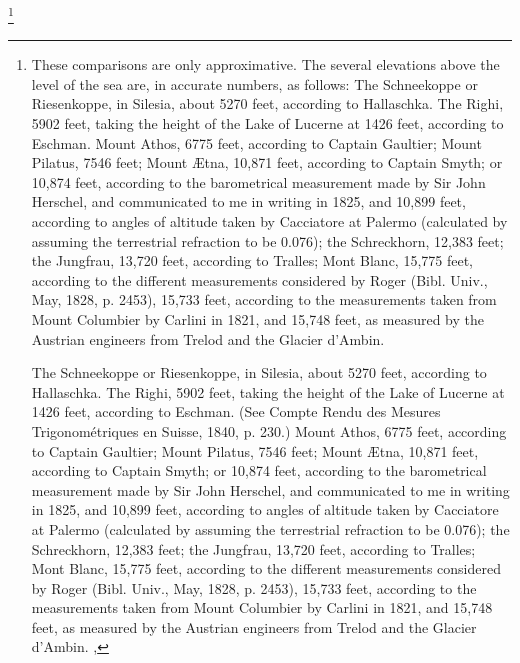 \footnote{These comparisons are only approximative. The several elevations above the level of the sea are, in accurate numbers, as follows: The Schneekoppe or Riesenkoppe, in Silesia, about 5270 feet, according to Hallaschka. The Righi, 5902 feet, taking the height of the Lake of Lucerne at 1426 feet, according to Eschman. Mount Athos, 6775 feet, according to Captain Gaultier; Mount Pilatus, 7546 feet; Mount \AE tna, 10,871 feet, according to Captain Smyth; or 10,874 feet, according to the barometrical measurement made by Sir John Herschel, and communicated to me in writing in 1825, and 10,899 feet, according to angles of altitude taken by Cacciatore at Palermo (calculated by assuming the terrestrial refraction to be 0.076); the Schreckhorn, 12,383 feet; the Jungfrau, 13,720 feet, according to Tralles; Mont Blanc, 15,775 feet, according to the different measurements considered by Roger (Bibl. Univ., May, 1828, p. 2453), 15,733 feet, according to the measurements taken from Mount Columbier by Carlini in 1821, and 15,748 feet, as measured by the Austrian engineers from Trelod and the Glacier d'Ambin.

The Schneekoppe or Riesenkoppe, in Silesia, about 5270 feet, according to Hallaschka. The Righi, 5902 feet, taking the height of the Lake of Lucerne at 1426 feet, according to Eschman. (See Compte Rendu des Mesures Trigonom\'{e}triques en Suisse, 1840, p. 230.) Mount Athos, 6775 feet, according to Captain Gaultier; Mount Pilatus, 7546 feet; Mount \AE tna, 10,871 feet, according to Captain Smyth; or 10,874 feet, according to the barometrical measurement made by Sir John Herschel, and communicated to me in writing in 1825, and 10,899 feet, according to angles of altitude taken by Cacciatore at Palermo (calculated by assuming the terrestrial refraction to be 0.076); the Schreckhorn, 12,383 feet; the Jungfrau, 13,720 feet, according to Tralles; Mont Blanc, 15,775 feet, according to the different measurements considered by Roger (Bibl. Univ., May, 1828, p. 2453), 15,733 feet, according to the measurements taken from Mount Columbier by Carlini in 1821, and 15,748 feet, as measured by the Austrian engineers from Trelod and the Glacier d'Ambin. ,

}
